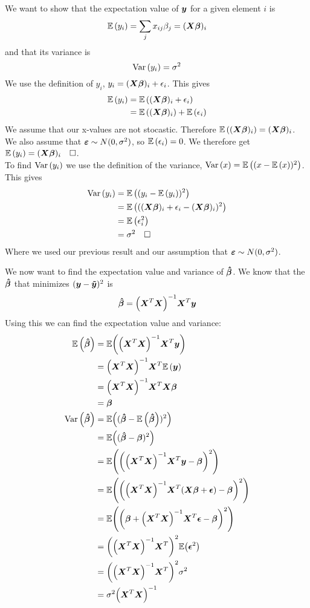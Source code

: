 \documentclass{article}
\begin{document}
We want to show that the expectation value of $\boldsymbol{y}$ for a given element $i$ is
$$\mathbb{E}\left(y_i\right) = \sum_j x_{ij}\beta_j = (\boldsymbol{X}\boldsymbol{\beta})_i$$
and that its variance is
$$\text{Var}\left(y_i\right) = \sigma^2$$
We use the definition of $y_i$, $y_i = (\boldsymbol{X}\boldsymbol{\beta})_i + \epsilon_i$. This gives
\begin{align*}
	\mathbb{E}\left(y_i\right) &= \mathbb{E}\left((\boldsymbol{X}\boldsymbol{\beta})_i + \epsilon_i\right) \\
	&= \mathbb{E}\left((\boldsymbol{X}\boldsymbol{\beta})_i\right) + \mathbb{E}\left(\epsilon_i\right) \\
\end{align*}
We assume that our x-values are not stocastic. Therefore $\mathbb{E}\left((\boldsymbol{X}\boldsymbol{\beta})_i\right) = (\boldsymbol{X}\boldsymbol{\beta})_i$.
We also assume that $\boldsymbol{\varepsilon} \sim N(0, \sigma^2)$, so $\mathbb{E}\left(\epsilon_i\right) = 0$.
We therefore get $\expy{y_i} = (\bs{X}\bs{\beta})_i\ \ \ \square$. \\
To find $\text{Var}\left(y_i\right)$ we use the definition of the variance, $\text{Var}\left(x\right) = \mathbb{E}\left((x - \mathbb{E}\left(x\right))^2\right)$. This gives
\begin{align*}
	\text{Var}\left(y_i\right) &= \mathbb{E}\left((y_i - \mathbb{E}\left(y_i\right))^2\right) \\
	&= \mathbb{E}\left(((\boldsymbol{X}\boldsymbol{\beta})_i + \epsilon_i - (\boldsymbol{X}\boldsymbol{\beta})_i)^2\right) \\
	&= \mathbb{E}\left(\epsilon_i^2\right) \\
	&= \sigma^2\ \ \ \square \\
\end{align*}
Where we used our previous result and our assumption that $\boldsymbol{\varepsilon} \sim N(0, \sigma^2)$.


We now want to find the expectation value and variance of $\boldsymbol{\hat{\beta}}$.
We know that the $\boldsymbol{\hat{\beta}}$ that minimizes
$(\boldsymbol{y} - \boldsymbol{\tilde{y}})^2$ is 
$$\boldsymbol{\hat{\beta}} = \qty(\boldsymbol{X}^T\boldsymbol{X})^{-1}\boldsymbol{X}^T\boldsymbol{y}$$
Using this we can find the expectation value and variance:
\begin{align*}
	\mathbb{E}\left(\boldsymbol{\hat{\beta}}\right) &= \mathbb{E}\qty(\qty(\boldsymbol{X}^T\boldsymbol{X})^{-1}\boldsymbol{X}^T\boldsymbol{y}) \\
	&= \qty(\boldsymbol{X}^T\boldsymbol{X})^{-1}\boldsymbol{X}^T\mathbb{E}\left(\boldsymbol{y}\right) \\
	&= \qty(\boldsymbol{X}^T\boldsymbol{X})^{-1}\boldsymbol{X}^T\boldsymbol{X}\boldsymbol{\beta} \\
	&= \boldsymbol{\beta} \\
	\text{Var}\left(\boldsymbol{\hat{\beta}}\right) &= \mathbb{E}\qty((\boldsymbol{\hat{\beta}} - \mathbb{E}\left(\boldsymbol{\hat{\beta}}\right))^2) \\
	&= \mathbb{E}\qty((\boldsymbol{\hat{\beta}} - \boldsymbol{\beta})^2) \\
	&= \mathbb{E}\qty(\qty(\qty(\boldsymbol{X}^T\boldsymbol{X})^{-1}\boldsymbol{X}^T\boldsymbol{y} - \boldsymbol{\beta})^2) \\
	&= \mathbb{E}\qty(\qty(\qty(\boldsymbol{X}^T\boldsymbol{X})^{-1}\boldsymbol{X}^T(\boldsymbol{X}\boldsymbol{\beta} + \boldsymbol{\epsilon}) - \boldsymbol{\beta})^2) \\
	&= \mathbb{E}\qty(\qty(\boldsymbol{\beta} + \qty(\boldsymbol{X}^T\boldsymbol{X})^{-1}\boldsymbol{X}^T\boldsymbol{\epsilon} - \boldsymbol{\beta})^2) \\
	&= \qty(\qty(\boldsymbol{X}^T\boldsymbol{X})^{-1}\boldsymbol{X}^T)^2\mathbb{E}\qty(\boldsymbol{\epsilon}^2) \\
	&= \qty(\qty(\boldsymbol{X}^T\boldsymbol{X})^{-1}\boldsymbol{X}^T)^2\sigma^2 \\
	&= \sigma^2\qty(\boldsymbol{X}^T\boldsymbol{X})^{-1} \\
\end{align*}
\end{document}
